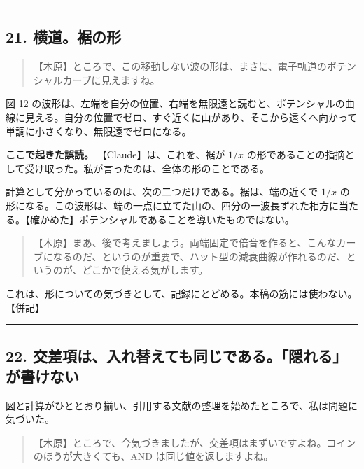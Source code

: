 \documentclass[
  a4paper,
]{ltjsarticle}
\begin{document}
\begin{center}\rule{0.5\linewidth}{0.5pt}\end{center}

\subsection{21. 横道。裾の形}\label{ux6a2aux9053ux88feux306eux5f62}

\begin{quote}
【木原】ところで、この移動しない波の形は、まさに、電子軌道のポテンシャルカーブに見えますね。
\end{quote}

図 12
の波形は、左端を自分の位置、右端を無限遠と読むと、ポテンシャルの曲線に見える。自分の位置でゼロ、すぐ近くに山があり、そこから遠くへ向かって単調に小さくなり、無限遠でゼロになる。

\textbf{ここで起きた誤読。} 【Claude】は、これを、裾が \(1/x\)
の形であることの指摘として受け取った。私が言ったのは、全体の形のことである。

計算として分かっているのは、次の二つだけである。裾は、端の近くで \(1/x\)
の形になる。この波形は、端の一点に立てた山の、四分の一波長ずれた相方に当たる。【確かめた】ポテンシャルであることを導いたものではない。

\begin{quote}
【木原】まあ、後で考えましょう。両端固定で倍音を作ると、こんなカーブになるのだ、というのが重要で、ハット型の減衰曲線が作れるのだ、というのが、どこかで使える気がします。
\end{quote}

これは、形についての気づきとして、記録にとどめる。本稿の筋には使わない。【併記】

\begin{center}\rule{0.5\linewidth}{0.5pt}\end{center}

\subsection{22.
交差項は、入れ替えても同じである。「隠れる」が書けない}\label{ux4ea4ux5deeux9805ux306fux5165ux308cux66ffux3048ux3066ux3082ux540cux3058ux3067ux3042ux308bux96a0ux308cux308bux304cux66f8ux3051ux306aux3044}

図と計算がひととおり揃い、引用する文献の整理を始めたところで、私は問題に気づいた。

\begin{quote}
【木原】ところで、今気づきましたが、交差項はまずいですよね。コインのほうが大きくても、AND
は同じ値を返しますよね。
\end{quote}
\end{document}
